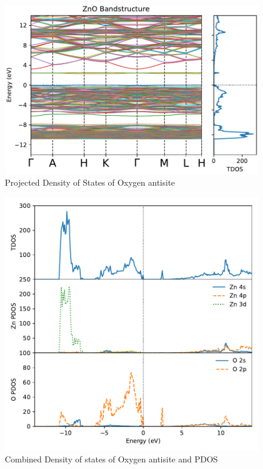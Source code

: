 \begin{figure}[tbh!]
	\centering
	\includegraphics[width=0.7\linewidth]{"images/band-dos_O-antisite"}
	\caption[Combined Density of states of Oxygen antisite]{Projected Density of States of Oxygen antisite}
\end{figure}

\begin{figure}[tbh!]
	\centering
	\includegraphics[width=0.7\linewidth]{"images/dos-pdos_O-antisite"}
	\caption[Combined Density of states of Oxygen antisite and PDOS]{Combined Density of states of Oxygen antisite and PDOS}
\end{figure}





